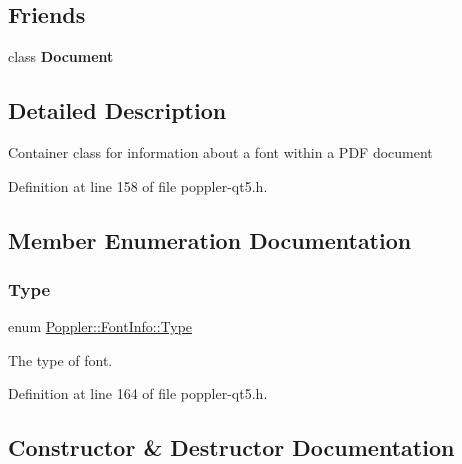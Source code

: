 \subsection*{Friends}
\begin{DoxyCompactItemize}
\item 
\mbox{\label{class_poppler_1_1_font_info_a883538034e58fc5c0de7d4e4cab3cef7}} 
class {\bfseries Document}
\end{DoxyCompactItemize}


\subsection{Detailed Description}
Container class for information about a font within a P\+DF document 

Definition at line 158 of file poppler-\/qt5.\+h.



\subsection{Member Enumeration Documentation}
\mbox{\label{class_poppler_1_1_font_info_a98fc6abbc1e3583d68751bd431e297ab}} 
\subsubsection{\texorpdfstring{Type}{Type}}
{\footnotesize\ttfamily enum \hyperlink{class_poppler_1_1_font_info_a98fc6abbc1e3583d68751bd431e297ab}{Poppler\+::\+Font\+Info\+::\+Type}}

The type of font. 

Definition at line 164 of file poppler-\/qt5.\+h.



\subsection{Constructor \& Destructor Documentation}
\mbox{\label{class_poppler_1_1_font_info_a53208547826cd7ac75458c83c23bb1e1}} 
